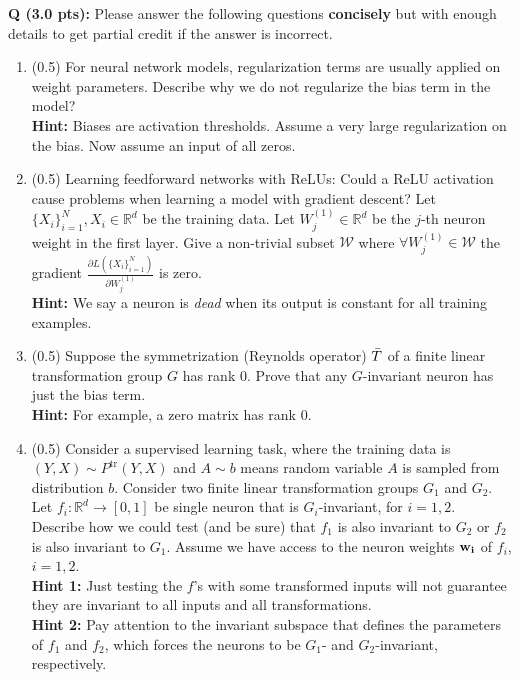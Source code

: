 \documentclass{article}
\newcounter{questionno}
\newcounter{partno}
\newcommand{\question}[1]{
\noindent
\newline
\stepcounter{questionno}
\setcounter{partno}{0}
{\bf Q\arabic{questionno} (#1 pts): }
}
\begin{document}
\newpage
\question{3.0} Please answer the following questions \textbf{concisely} but with enough details to get partial credit if the answer is incorrect. 

\begin{enumerate}


\item (0.5) For neural network models, regularization terms are usually applied on weight parameters. Describe why we do not regularize the bias term in the model? \\
{\bf Hint:} Biases are activation thresholds. Assume a very large regularization on the bias. Now assume an input of all zeros.
\vspace{3in}

\item (0.5)  Learning  feedforward networks with ReLUs: Could a ReLU activation cause problems when learning a model with gradient descent? Let $\{X_i\}_{i=1}^N,X_i\in \mathbb{R}^d$ be the training data. Let $W_j^{(1)}\in \mathbb{R}^d$ be the $j$-th neuron weight in the first layer. Give a non-trivial subset $\mathcal{W}$ where $\forall W_j^{(1)}\in \mathcal{W}$ the gradient $\frac{\partial L(\{X_i\}_{i=1}^N)}{\partial W_j^{(1)}}$ is zero. \\
{\bf Hint:} We say a neuron is {\em dead} when its output is constant for all training examples. \\


\newpage

\item (0.5) 
Suppose the symmetrization (Reynolds operator) $\Bar{T}$ of a finite linear transformation group $G$ has rank $0$. Prove that any $G$-invariant neuron has just the bias term.\\
{\bf Hint:} For example, a zero matrix has rank $0$.
\vspace{3in}


\item (0.5)  Consider a supervised learning task, where the training data is $(Y,X) \sim P^\text{tr}(Y,X)$ and $A \sim b$ means random variable $A$ is sampled from distribution $b$. Consider two finite linear transformation groups $G_1$ and $G_2$. Let $f_i: \mathbb{R}^d \to [0,1]$ be single neuron that is $G_i$-invariant, for $i=1,2$. Describe how we could test (and be sure) that $f_1$ is also invariant to $G_2$ or $f_2$ is also invariant to $G_1$. Assume we have access to the neuron weights ${\bf w_i}$ of $f_i$, $i=1,2$. \\
{\bf Hint 1:} Just testing the $f$'s with some transformed inputs will not guarantee they are invariant to all inputs and all transformations.\\
{\bf Hint 2:} Pay attention to the invariant subspace that defines the parameters of $f_1$ and $f_2$, which forces the neurons to be $G_1$- and $G_2$-invariant, respectively.


\end{enumerate}
\end{document}
